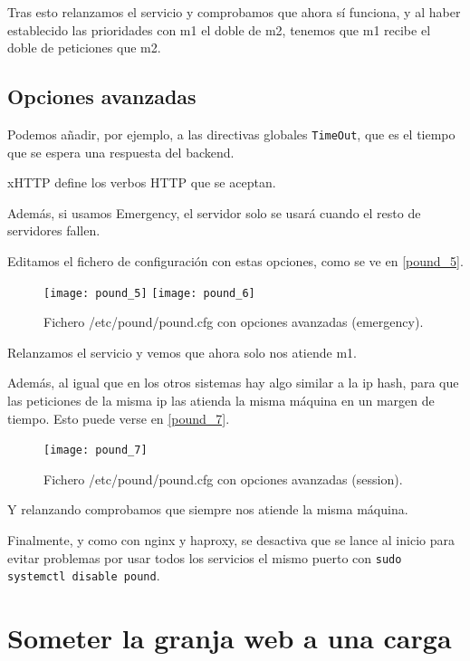 Tras esto relanzamos el servicio y comprobamos que ahora sí funciona, y al haber establecido las prioridades con m1 el doble de m2, tenemos que m1 recibe el doble de peticiones que m2.

\section{Opciones avanzadas}

Podemos añadir, por ejemplo, a las directivas globales \verb|TimeOut|, que es el tiempo que se espera una respuesta del backend.

xHTTP define los verbos HTTP que se aceptan.

Además, si usamos Emergency, el servidor solo se usará cuando el resto de servidores fallen.

Editamos el fichero de configuración con estas opciones, como se ve en \eqref{pound_5}.

\begin{figure}[h!]
\begin{center}
\caption{Fichero /etc/pound/pound.cfg con opciones avanzadas (emergency).}
\label{pound_5}
\texttt{[image: pound\_5]}
\texttt{[image: pound\_6]}
\end{center}
\end{figure}

Relanzamos el servicio y vemos que ahora solo nos atiende m1.

Además, al igual que en los otros sistemas hay algo similar a la ip hash, para que las peticiones de la misma ip las atienda la misma máquina en un margen de tiempo. Esto puede verse en \eqref{pound_7}.

\begin{figure}[h!]
\begin{center}
\caption{Fichero /etc/pound/pound.cfg con opciones avanzadas (session).}
\label{pound_7}
\texttt{[image: pound\_7]}
\end{center}
\end{figure}

Y relanzando comprobamos que siempre nos atiende la misma máquina.

Finalmente, y como con nginx y haproxy, se desactiva que se lance al inicio para evitar problemas por usar todos los servicios el mismo puerto con \verb|sudo systemctl disable pound|.

\chapter{Someter la granja web a una carga}

